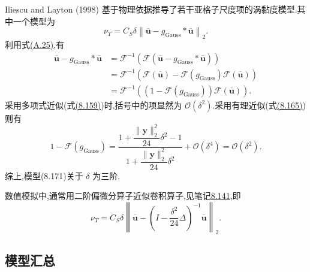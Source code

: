 \begin{note}[基于物理依据的模型]
\label{note:les-physical-sgs-model}
Iliescu and Layton (1998) 基于物理依据推导了若干亚格子尺度项的涡黏度模型.其中一个模型为
\begin{equation}\label{eq:iliescu-layton-sgs-model}
 \nu_T=C_S\delta
 \left\|\overline{\bm{u}}
 -g_{\mathrm{Gauss}}*\overline{\bm{u}}\right\|_2.
\end{equation}
利用式\hyperref[eq:appendix-a-25]{(A.25)},有
\[
\begin{aligned}
 \overline{\bm{u}}
 -g_{\mathrm{Gauss}}*\overline{\bm{u}}
 &=\mathcal{F}^{-1}\!\left(
   \mathcal{F}\left(
    \overline{\bm{u}}
    -g_{\mathrm{Gauss}}*\overline{\bm{u}}\right)\right)\\
 &=\mathcal{F}^{-1}\!\left(
   \mathcal{F}(\overline{\bm{u}})
   -\mathcal{F}(g_{\mathrm{Gauss}})
    \mathcal{F}(\overline{\bm{u}})\right)\\
 &=\mathcal{F}^{-1}\!\left(
   (1-\mathcal{F}(g_{\mathrm{Gauss}}))
   \mathcal{F}(\overline{\bm{u}})\right).
\end{aligned}
\]
采用多项式近似(式\hyperref[eq:les-taylor-filter-expansion]{(8.159)})时,括号中的项显然为 $\mathcal{O}(\delta^2)$.采用有理近似(式\hyperref[eq:les-rational-filter-expansion]{(8.165)})则有
\[
 1-\mathcal{F}(g_{\mathrm{Gauss}})
 =\frac{1+\dfrac{\|\bm{y}\|_2^2}{24}\delta^2-1}
        {1+\dfrac{\|\bm{y}\|_2^2}{24}\delta^2}
  +\mathcal{O}(\delta^4)
 =\mathcal{O}(\delta^2).
\]
综上,模型(8.171)关于 $\delta$ 为三阶.

数值模拟中,通常用二阶偏微分算子近似卷积算子,见笔记\hyperref[note:les-differential-filter-convolution-approximation]{8.141},即
\begin{equation}\label{eq:iliescu-layton-sgs-model-differential}
 \nu_T=C_S\delta
 \left\|\overline{\bm{u}}
 -\left(I-\frac{\delta^2}{24}\Delta\right)^{-1}
  \overline{\bm{u}}\right\|_2.
\end{equation}
\end{note}
\subsection{模型汇总}
\label{subsec:les-wave-number-resulting-models}


